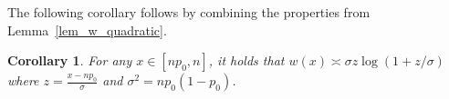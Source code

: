 \documentclass{article}
\newtheorem{corollary}{Corollary}
\begin{document}
The following corollary follows by combining the properties from Lemma~\ref{lem_w_quadratic}.

\begin{corollary}\label{cor_w_growth_w}
    For any $x \in [np_0,n]$, it holds that $w(x) \asymp \sigma z \log(1+z/\sigma)$ where $z = \frac{x-np_0}{\sigma}$ and $\sigma^2 = np_0(1-p_0)$.
\end{corollary}
\end{document}
